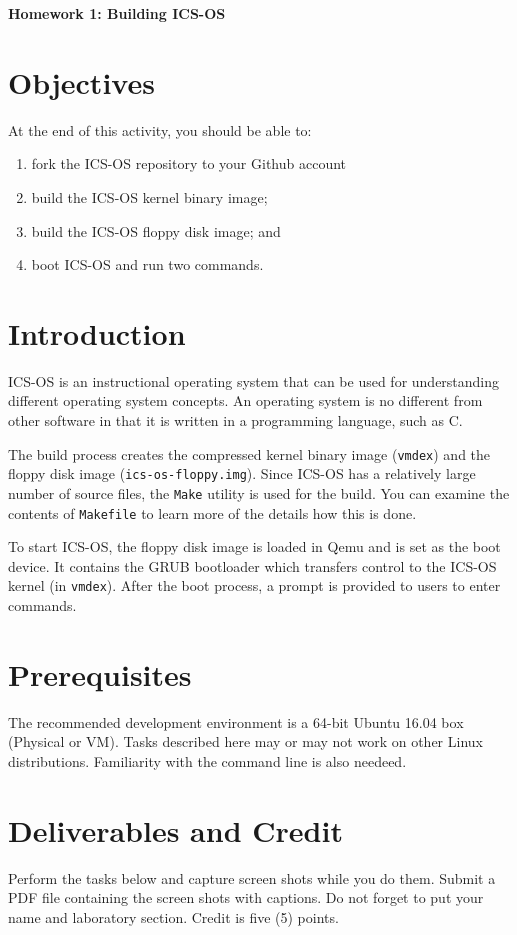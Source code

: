 \documentclass[a4paper, 11pt,oneside]{article}
\begin{document}
\begin{center}
	{\LARGE \textbf{Homework 1: Building ICS-OS}}
\end{center}

\section*{Objectives}
   At the end of this activity, you should be able to:
   \begin{enumerate}[itemsep=0pt,parsep=0pt]
   	   \item fork the ICS-OS repository to your Github account
       \item build the ICS-OS kernel binary image;
       \item build the ICS-OS floppy disk image; and
       \item boot ICS-OS and run two commands.
   \end{enumerate}   

\section{Introduction}
ICS-OS is an instructional operating system that can be used for understanding different operating system concepts.  An operating system is no different from other software in that it is written in a programming language, such as C. 

The build process creates the compressed kernel binary image (\texttt{vmdex}) and the floppy disk image (\texttt{ics-os-floppy.img}). Since ICS-OS has a relatively large number of source files, 
the \texttt{Make} utility is used for the build. You can examine the contents of \texttt{Makefile} 
to learn more of the details how this is done.

To start ICS-OS, the floppy disk image is loaded in Qemu and is set as the boot device. It contains 
the GRUB bootloader which transfers control to the ICS-OS kernel (in \texttt{vmdex}). After the boot process, a prompt is provided to users to enter commands. 

\section{Prerequisites}
The recommended development environment is a 64-bit Ubuntu 16.04 box (Physical or VM). Tasks described here may or may not 
work on other Linux distributions. Familiarity with the command line is also needeed.

\section{Deliverables and Credit}
Perform the tasks below and capture screen shots while you do them. Submit a PDF file 
containing the screen shots with captions. Do not forget to put your name and laboratory section.
Credit is five (5) points.
\end{document}
